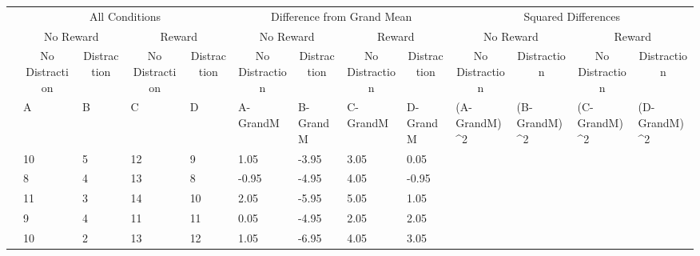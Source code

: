 \documentclass[
]{book}
\begin{document}
\begin{table}
\centering
\begin{tabular}{l|l|l|l|l|l|l|l|l|>{}l|>{}l|>{}l|>{}l}
\hline
\multicolumn{1}{c|}{ } & \multicolumn{4}{c|}{All Conditions} & \multicolumn{4}{c|}{Difference from Grand Mean} & \multicolumn{4}{c}{Squared Differences} \\
\cline{2-5} \cline{6-9} \cline{10-13}
\multicolumn{1}{c|}{ } & \multicolumn{2}{c|}{No Reward} & \multicolumn{2}{c|}{Reward} & \multicolumn{2}{c|}{No Reward} & \multicolumn{2}{c|}{Reward} & \multicolumn{2}{c|}{No Reward} & \multicolumn{2}{c}{Reward} \\
\cline{2-3} \cline{4-5} \cline{6-7} \cline{8-9} \cline{10-11} \cline{12-13}
\multicolumn{1}{c|}{ } & \multicolumn{1}{c|}{No Distraction} & \multicolumn{1}{c|}{Distraction} & \multicolumn{1}{c|}{No Distraction} & \multicolumn{1}{c|}{Distraction} & \multicolumn{1}{c|}{No Distraction} & \multicolumn{1}{c|}{Distraction} & \multicolumn{1}{c|}{No Distraction} & \multicolumn{1}{c|}{Distraction} & \multicolumn{1}{c|}{No Distraction} & \multicolumn{1}{c|}{Distraction} & \multicolumn{1}{c|}{No Distraction} & \multicolumn{1}{c}{Distraction} \\
\cline{2-2} \cline{3-3} \cline{4-4} \cline{5-5} \cline{6-6} \cline{7-7} \cline{8-8} \cline{9-9} \cline{10-10} \cline{11-11} \cline{12-12} \cline{13-13}
  & A & B & C & D & A-GrandM & B-GrandM & C-GrandM & D-GrandM & (A-GrandM)\textasciicircum{}2 & (B-GrandM)\textasciicircum{}2 & (C-GrandM)\textasciicircum{}2 & (D-GrandM)\textasciicircum{}2\\
\hline
 & 10 & 5 & 12 & 9 & 1.05 & -3.95 & 3.05 & 0.05 & \cellcolor{yellow}{1.1025} & \cellcolor{yellow}{15.6025} & \cellcolor{yellow}{9.3025} & \cellcolor{yellow}{0.0025}\\
\hline
 & 8 & 4 & 13 & 8 & -0.95 & -4.95 & 4.05 & -0.95 & \cellcolor{yellow}{0.9025} & \cellcolor{yellow}{24.5025} & \cellcolor{yellow}{16.4025} & \cellcolor{yellow}{0.9025}\\
\hline
 & 11 & 3 & 14 & 10 & 2.05 & -5.95 & 5.05 & 1.05 & \cellcolor{yellow}{4.2025} & \cellcolor{yellow}{35.4025} & \cellcolor{yellow}{25.5025} & \cellcolor{yellow}{1.1025}\\
\hline
 & 9 & 4 & 11 & 11 & 0.05 & -4.95 & 2.05 & 2.05 & \cellcolor{yellow}{0.0025} & \cellcolor{yellow}{24.5025} & \cellcolor{yellow}{4.2025} & \cellcolor{yellow}{4.2025}\\
\hline
 & 10 & 2 & 13 & 12 & 1.05 & -6.95 & 4.05 & 3.05 & \cellcolor{yellow}{1.1025} & \cellcolor{yellow}{48.3025} & \cellcolor{yellow}{16.4025} & \cellcolor{yellow}{9.3025}\\

\end{tabular}
\end{table}
\end{document}
